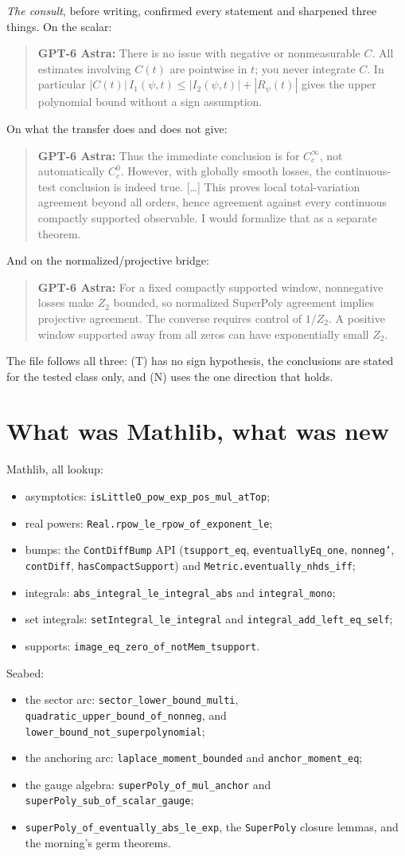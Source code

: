 \documentclass[11pt]{article}
\newcommand{\code}[1]{\texttt{#1}}
\newcommand{\gptbox}[1]{\par\medskip\begin{quote}\small\textbf{\textcolor{green!50!black}{GPT-6 Astra:}} #1\end{quote}\medskip}
\begin{document}
\emph{The consult}, before writing, confirmed every statement and
sharpened three things. On the scalar:
\gptbox{There is no issue with negative or nonmeasurable $C$. All
estimates involving $C(t)$ are pointwise in $t$; you never integrate
$C$. In particular $|C(t)|\,I_1(\psi,t) \le |I_2(\psi,t)| +
|R_\psi(t)|$ gives the upper polynomial bound without a sign
assumption.}
On what the transfer does and does not give:
\gptbox{Thus the immediate conclusion is for $C_c^\infty$, not
automatically $C_c^0$. However, with globally smooth losses, the
continuous-test conclusion is indeed true. [\ldots] This proves local
total-variation agreement beyond all orders, hence agreement against
every continuous compactly supported observable. I would formalize that
as a separate theorem.}
And on the normalized/projective bridge:
\gptbox{For a fixed compactly supported window, nonnegative losses make
$Z_2$ bounded, so normalized SuperPoly agreement implies projective
agreement. The converse requires control of $1/Z_2$. A positive window
supported away from all zeros can have exponentially small $Z_2$.}
The file follows all three: (T) has no sign hypothesis, the conclusions
are stated for the tested class only, and (N) uses the one direction
that holds.

\section{What was Mathlib, what was new}

Mathlib, all lookup:
\begin{itemize}
\item asymptotics: \code{isLittleO\_pow\_exp\_pos\_mul\_atTop};
\item real powers: \code{Real.rpow\_le\_rpow\_of\_exponent\_le};
\item bumps: the \code{ContDiffBump} API (\code{tsupport\_eq},
\code{eventuallyEq\_one}, \code{nonneg'}, \code{contDiff},
\code{hasCompactSupport}) and \code{Metric.eventually\_nhds\_iff};
\item integrals: \code{abs\_integral\_le\_integral\_abs} and
\code{integral\_mono};
\item set integrals: \code{setIntegral\_le\_integral} and
\code{integral\_add\_left\_eq\_self};
\item supports: \code{image\_eq\_zero\_of\_notMem\_tsupport}.
\end{itemize}

Seabed:
\begin{itemize}
\item the sector arc: \code{sector\_lower\_bound\_multi},
\code{quadratic\_upper\_bound\_of\_nonneg}, and
\code{lower\_bound\_not\_superpolynomial};
\item the anchoring arc: \code{laplace\_moment\_bounded} and
\code{anchor\_moment\_eq};
\item the gauge algebra: \code{superPoly\_of\_mul\_anchor} and
\code{superPoly\_sub\_of\_scalar\_gauge};
\item \code{superPoly\_of\_eventually\_abs\_le\_exp}, the
\code{SuperPoly} closure lemmas, and the morning's germ theorems.
\end{itemize}
\end{document}
